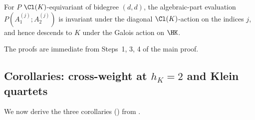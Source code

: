 \begin{lemma}\label{lem:Galois-sym}
For $P$ $\Cl(K)$-equivariant of bidegree $(d, d)$, the
algebraic-part evaluation $P(A_1^{(j)}; A_2^{(j)})$ is invariant
under the diagonal $\Cl(K)$-action on the indices $j$, and hence
descends to $K$ under the Galois action on $\HK$.
\end{lemma}

The proofs are immediate from Steps~1, 3, 4 of the main proof.

\subsection{Corollaries: cross-weight at $h_K = 2$ and Klein
quartets}\label{ss:corollaries-proof}

We now derive the three corollaries
()
from .

